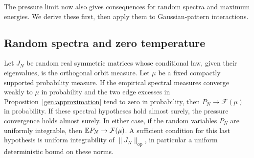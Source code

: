 The pressure limit now also gives consequences for random spectra and
maximum energies. We derive these first, then apply them to
Gaussian-pattern interactions.

\subsection{Random spectra and zero temperature}

\begin{proposition}\label{gen:random}
Let $J_N$ be random real symmetric matrices whose conditional law,
given their eigenvalues, is the orthogonal orbit measure.  Let $\mu$
be a fixed compactly supported probability measure.  If the empirical
spectral measures converge weakly to $\mu$ in probability and the two
edge excesses in Proposition~\ref{gen:approximation} tend to zero in
probability, then $P_N\to\mathcal F(\mu)$ in probability.  If these
spectral hypotheses hold almost surely, the pressure convergence
holds almost surely.  In either case, if the random variables $P_N$
are uniformly integrable, then $\mathbb E P_N\to\mathcal F(\mu)$.
A sufficient condition for this last hypothesis is uniform
integrability of $\|J_N\|_{\mathrm{op}}$, in particular a uniform
deterministic bound on these norms.
\end{proposition}

